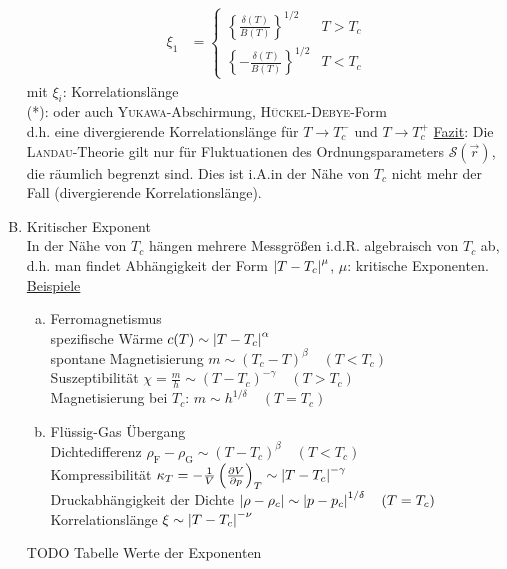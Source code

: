 \begin{enumerate}[A)]
\begin{equation}
\begin{split}
            \xi_1 &= 
            \begin{cases}
                \left\{ \frac{\delta(T)}{B(T)} \right\}^{1/2} & T > T_c \\
                \left\{ - \frac{\delta(T)}{B(T)} \right\}^{1/2} & T < T_c
            \end{cases}
        \end{split}
    \end{equation}
    mit $\xi_i$: Korrelationslänge \\
    (*): oder auch \textsc{Yukawa}-Abschirmung, \textsc{Hückel-Debye}-Form \\
    d.h. eine divergierende Korrelationslänge für $T\to T_c^-$ und $T \to T_c^+$
    \underline{Fazit}: Die \textsc{Landau}-Theorie gilt nur für Fluktuationen des Ordnungsparameters $\mathcal{S}(\vec{r})$, die räumlich begrenzt sind.
    Dies ist i.A.in der Nähe von $T_c$ nicht mehr der Fall (divergierende Korrelationslänge).
    \item Kritischer Exponent \\
    In der Nähe von $T_c$ hängen mehrere Messgrößen i.d.R. algebraisch von $T_c$ ab, d.h. man findet Abhängigkeit der Form $\left| T-T_c \right|^\mu$,
    $\mu$: kritische Exponenten.\\
    \underline{Beispiele}
    \begin{enumerate}[a)]
        \item Ferromagnetismus \\
        spezifische Wärme $c(T) \sim \left| T-T_c \right|^\alpha$ \\
        spontane Magnetisierung $m \sim (T_c-T)^\beta \quad (T<T_c)$ \\
        Suszeptibilität $\chi = \frac{m}{h} \sim (T-T_c)^{-\gamma} \quad (T > T_c)$ \\
        Magnetisierung bei $T_c$: $m \sim h^{1/\delta} \quad (T=T_c)$
        \item Flüssig-Gas Übergang \\
        Dichtedifferenz $\rho_\text{F}-\rho_\text{G} \sim (T-T_c)^\beta \quad (T < T_c)$ \\
        Kompressibilität $\kappa_T = - \frac{1}{V} \left( \frac{\partial V}{\partial p} \right)_{T} \sim \left| T-T_c \right|^{-\gamma}$ \\
        Druckabhängigkeit der Dichte $\left| \rho-\rho_c \right| \sim \left| p-p_c \right|^{1/\delta} \quad (T=T_c)$ \\
        Korrelationslänge $\xi \sim \left| T-T_c \right|^{-\nu}$
    \end{enumerate}
    TODO Tabelle Werte der Exponenten \\ %

\end{enumerate}
